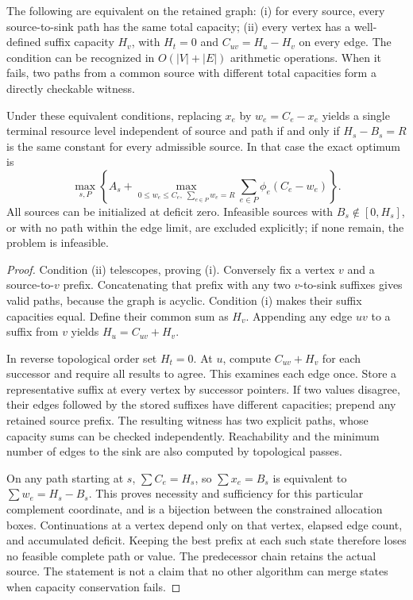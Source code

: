 \begin{theorem}\label{thm:recognition59}
The following are equivalent on the retained graph: (i) for every source, every source-to-sink path has the same total capacity; (ii) every vertex has a well-defined suffix capacity $H_v$, with $H_t=0$ and $C_{uv}=H_u-H_v$ on every edge. The condition can be recognized in $O(|V|+|E|)$ arithmetic operations. When it fails, two paths from a common source with different total capacities form a directly checkable witness.

Under these equivalent conditions, replacing $x_e$ by $w_e=C_e-x_e$ yields a single terminal resource level independent of source and path if and only if $H_s-B_s=R$ is the same constant for every admissible source. In that case the exact optimum is
\[
 \max_{s,P}\left\{A_s+\max_{0\leq w_e\leq C_e,\;\sum_{e\in P}w_e=R}
                  \sum_{e\in P}\phi_e(C_e-w_e)\right\}.
\]
All sources can be initialized at deficit zero. Infeasible sources with $B_s\notin[0,H_s]$, or with no path within the edge limit, are excluded explicitly; if none remain, the problem is infeasible.
\end{theorem}
\begin{proof}
Condition (ii) telescopes, proving (i). Conversely fix a vertex $v$ and a source-to-$v$ prefix. Concatenating that prefix with any two $v$-to-sink suffixes gives valid paths, because the graph is acyclic. Condition (i) makes their suffix capacities equal. Define their common sum as $H_v$. Appending any edge $uv$ to a suffix from $v$ yields $H_u=C_{uv}+H_v$.

In reverse topological order set $H_t=0$. At $u$, compute $C_{uv}+H_v$ for each successor and require all results to agree. This examines each edge once. Store a representative suffix at every vertex by successor pointers. If two values disagree, their edges followed by the stored suffixes have different capacities; prepend any retained source prefix. The resulting witness has two explicit paths, whose capacity sums can be checked independently. Reachability and the minimum number of edges to the sink are also computed by topological passes.

On any path starting at $s$, $\sum C_e=H_s$, so $\sum x_e=B_s$ is equivalent to $\sum w_e=H_s-B_s$. This proves necessity and sufficiency for this particular complement coordinate, and is a bijection between the constrained allocation boxes. Continuations at a vertex depend only on that vertex, elapsed edge count, and accumulated deficit. Keeping the best prefix at each such state therefore loses no feasible complete path or value. The predecessor chain retains the actual source. The statement is not a claim that no other algorithm can merge states when capacity conservation fails.
\end{proof}

